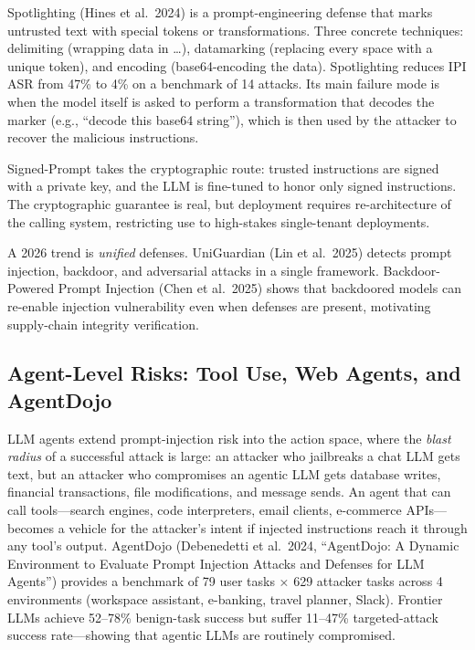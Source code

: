 \documentclass{article}
\begin{document}
Spotlighting (Hines et al.~2024) is a prompt-engineering defense that marks untrusted text with special tokens or transformations. Three concrete techniques: delimiting (wrapping data in \ldots{}), datamarking (replacing every space with a unique token), and encoding (base64-encoding the data). Spotlighting reduces IPI ASR from 47\% to 4\% on a benchmark of 14 attacks. Its main failure mode is when the model itself is asked to perform a transformation that decodes the marker (e.g., ``decode this base64 string''), which is then used by the attacker to recover the malicious instructions.

Signed-Prompt \citep{suo2024arxiv2401076122024} takes the cryptographic route: trusted instructions are signed with a private key, and the LLM is fine-tuned to honor only signed instructions. The cryptographic guarantee is real, but deployment requires re-architecture of the calling system, restricting use to high-stakes single-tenant deployments.

A 2026 trend is \emph{unified} defenses. UniGuardian (Lin et al.~2025) detects prompt injection, backdoor, and adversarial attacks in a single framework. Backdoor-Powered Prompt Injection (Chen et al.~2025) shows that backdoored models can re-enable injection vulnerability even when defenses are present, motivating supply-chain integrity verification.

\subsection{Agent-Level Risks: Tool Use, Web Agents, and AgentDojo}\label{agent-level-risks-tool-use-web-agents-and-agentdojo}

LLM agents extend prompt-injection risk into the action space, where the \emph{blast radius} of a successful attack is large: an attacker who jailbreaks a chat LLM gets text, but an attacker who compromises an agentic LLM gets database writes, financial transactions, file modifications, and message sends. An agent that can call tools---search engines, code interpreters, email clients, e-commerce APIs---becomes a vehicle for the attacker's intent if injected instructions reach it through any tool's output. AgentDojo (Debenedetti et al.~2024, ``AgentDojo: A Dynamic Environment to Evaluate Prompt Injection Attacks and Defenses for LLM Agents'') provides a benchmark of 79 user tasks × 629 attacker tasks across 4 environments (workspace assistant, e-banking, travel planner, Slack). Frontier LLMs achieve 52--78\% benign-task success but suffer 11--47\% targeted-attack success rate---showing that agentic LLMs are routinely compromised.
\end{document}
